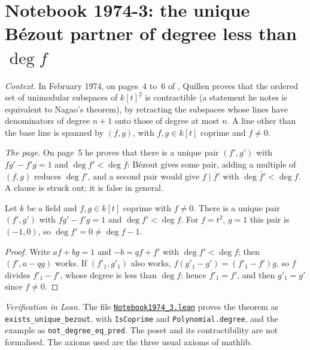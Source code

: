 \section[Notebook 1974-3: the Bézout partner of small degree]{Notebook 1974-3: the unique Bézout partner of degree less than $\deg f$\protect{}}\label{sec:quillen-1974-3}

\emph{Context.} In February 1974, on pages~4 to~6 of , Quillen proves that the ordered set of unimodular subspaces of $k[t]^2$ is contractible (a statement he notes is equivalent to Nagao's theorem), by retracting the subspaces whose lines have denominators of degree $n + 1$ onto those of degree at most $n$. A line other than the base line is spanned by $(f, g)$, with $f, g \in k[t]$ coprime and $f \ne 0$.

\emph{The page.} On page~5 he proves that there is a unique pair $(f', g')$ with $fg' - f'g = 1$ and $\deg f' < \deg f$: Bézout gives some pair, adding a multiple of $(f, g)$ reduces $\deg f'$, and a second pair would give $f \mid \bar f'$ with $\deg \bar f' < \deg f$. A clause  is struck out; it is false in general.

\begin{encadre}
\begin{theoreme}\label{thm:quillen-1974-3}
Let $k$ be a field and $f, g \in k[t]$ coprime with $f \ne 0$. There is a unique pair $(f', g')$ with $fg' - f'g = 1$ and $\deg f' < \deg f$. For $f = t^2$, $g = 1$ this pair is $(-1, 0)$, so $\deg f' = 0 \ne \deg f - 1$.
\end{theoreme}
\end{encadre}

\begin{proof}
Write $af + bg = 1$ and $-b = qf + f'$ with $\deg f' < \deg f$; then $(f', a - qg)$ works. If $(f'_1, g'_1)$ also works, $f(g'_1 - g') = (f'_1 - f')g$, so $f$ divides $f'_1 - f'$, whose degree is less than $\deg f$; hence $f'_1 = f'$, and then $g'_1 = g'$ since $f \ne 0$.
\end{proof}

\emph{Verification in Lean.} The file \href{\leanblobmain/Notebook1974_3.lean}{\texttt{Notebook1974\_3.\allowbreak{}lean}} proves the theorem as \texttt{exists\_unique\_bezout}, with \texttt{IsCoprime} and \texttt{Polynomial.degree}, and the example as \texttt{not\_degree\_eq\_pred}. The poset and its contractibility are not formalised. The axioms used are the three usual axioms of mathlib.

